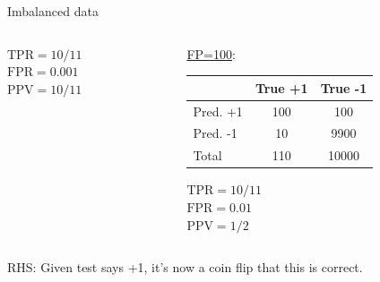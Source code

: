\begin{vbframe}{Imbalanced data}
\begin{columns}
\begin{column}{0.45\textwidth}
 \medskip
 $\text{TPR} = 10/11$\\
 $\text{FPR} = 0.001$\\
 $\text{PPV} = 10/11$
\end{column}
\begin{column}{0.45\textwidth}
 \underline{FP=100}:\\
 \lz
 {
 \tiny
 \begin{tabular}{|l|c|c|}
                 \hline
                & True +1 & True -1 \\ \hline
 Pred. +1 & 100            & 100            \\ \hline
 Pred. -1 & 10            & 9900           \\ \hline
 Total  & 110            & 10000           \\ \hline
 \end{tabular}
 }

 \medskip
 $\text{TPR} = 10/11$\\
 $\text{FPR} = 0.01$\\
 $\text{PPV} = 1/2$
\end{column}
\end{columns}

\vfill

RHS: Given test says +1, it's now a coin flip that this is correct.




\framebreak



\end{vbframe}
